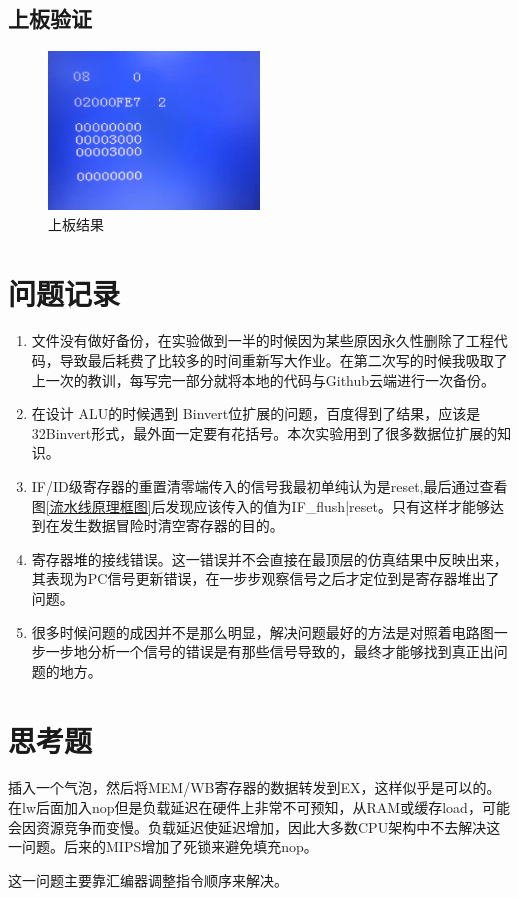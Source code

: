 \documentclass{../source/zjureport}
\begin{document}
        \subsection{上板验证}
        \begin{figure}[H]
            \centering
            \includegraphics[width = 0.5\textwidth]{figure/上板结果.jpg}
            \caption{上板结果}
        \end{figure}

    
    \section{问题记录}
        \begin{enumerate}
            \item 文件没有做好备份，在实验做到一半的时候因为某些原因永久性删除了工程代码，导致最后耗费了比较多的时间重新写大作业。在第二次写的时候我吸取了上一次的教训，每写完一部分就将本地的代码与Github云端进行一次备份。
            \item 在设计 ALU的时候遇到 Binvert位扩展的问题，百度得到了结果，应该是{32{Binvert}}形式，最外面一定要有花括号。本次实验用到了很多数据位扩展的知识。
            \item IF/ID级寄存器的重置清零端传入的信号我最初单纯认为是reset,最后通过查看图\ref{流水线原理框图}后发现应该传入的值为IF_flush|reset。只有这样才能够达到在发生数据冒险时清空寄存器的目的。
            \item 寄存器堆的接线错误。这一错误并不会直接在最顶层的仿真结果中反映出来，其表现为PC信号更新错误，在一步步观察信号之后才定位到是寄存器堆出了问题。
            \item 很多时候问题的成因并不是那么明显，解决问题最好的方法是对照着电路图一步一步地分析一个信号的错误是有那些信号导致的，最终才能够找到真正出问题的地方。
        \end{enumerate}

    \section{思考题}
    插入一个气泡，然后将MEM/WB寄存器的数据转发到EX，这样似乎是可以的。在lw后面加入nop但是负载延迟在硬件上非常不可预知，从RAM或缓存load，可能会因资源竞争而变慢。负载延迟使延迟增加，因此大多数CPU架构中不去解决这一问题。后来的MIPS增加了死锁来避免填充nop。
    
    这一问题主要靠汇编器调整指令顺序来解决。
\end{document}
